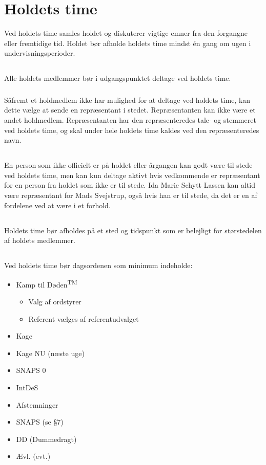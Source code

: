 \documentclass{article}
\newcommand{\KTD}{Kamp til Døden\textsuperscript{TM}}
\let\OldS\S
\renewcommand{\S}{\OldS{}}
\begin{document}
	\section{Holdets time}
	Ved holdets time samles holdet og diskuterer vigtige emner fra den forgangne eller
	fremtidige tid. Holdet bør afholde holdets time mindst én gang om ugen i
	undervisningsperioder.
	\subsection{}
	Alle holdets medlemmer bør i udgangspunktet deltage ved holdets time.
	\subsubsection{}
	Såfremt et holdmedlem ikke har mulighed for at deltage ved holdets time, kan dette vælge at sende en repræsentant i stedet. Repræsentanten kan ikke være et andet holdmedlem. Repræsentanten har den repræsenteredes tale- og stemmeret ved holdets time, og skal under hele holdets time kaldes ved den repræsenteredes navn.
	\subsection{}
	En person som ikke officielt er på holdet eller årgangen kan godt være til stede ved holdets time, men kan kun deltage aktivt hvis vedkommende er repræsentant for en person fra holdet som ikke er til stede. Ida Marie Schytt Lassen kan altid være repræsentant for Mads Svejstrup, også hvis han er til stede, da det er en af fordelene ved at være i et forhold.
	\subsection{}
	Holdets time bør afholdes på et sted og tidspunkt som er belejligt for størstedelen af holdets medlemmer.
	\subsection{}
	Ved holdets time bør dagsordenen som minimum indeholde:\\
	\begin{itemize}
		\item \KTD
		\begin{itemize}
			\item Valg af ordstyrer
			\item Referent vælges af referentudvalget
		\end{itemize}
		\item Kage
		\item Kage NU (næste uge)
		\item SNAPS 0
		\item IntDeS
		\item Afstemninger
		\item SNAPS (se \S{7})
		\item DD (Dummedragt)
		\item Ævl. (evt.)
	\end{itemize}
\end{document}
